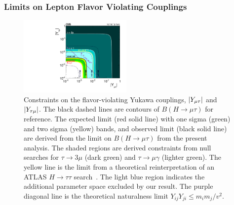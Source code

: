 \documentclass[oneside, letterpaper, oldfontcommands]{memoir}
\DeclarePairedDelimiter{\abs}{\lvert}{\rvert}
\begin{document}
 \subsubsection{Limits on Lepton Flavor Violating Couplings}
\begin{figure}[hbt]\centering
\includegraphics[width=0.49\textwidth]{yukawa.pdf}
 \caption{\cite{Khachatryan:2015kon}Constraints on the flavor-violating Yukawa couplings, $\abs{Y_{\mu\tau}}$ and $\abs{Y_{\tau\mu}}$.
The black dashed lines are contours of $B(H \rightarrow \mu \tau )$ for reference.
The expected limit (red solid line) with one sigma (green)  and two sigma (yellow) bands, and observed limit (black solid line) are derived from the limit on $B(H \rightarrow \mu \tau )$ from the present analysis.  The shaded regions are derived constraints from null searches for $\tau \rightarrow 3\mu$ (dark green) and $\tau \rightarrow \mu \gamma$ (lighter green). 
The yellow line is the limit from a theoretical reinterpretation of an ATLAS $H \rightarrow \tau \tau$ search~\cite{Harnik:2012pb}.
The light blue region indicates the additional parameter space excluded by our result.
The purple diagonal line is the theoretical naturalness
limit $Y_{ij}Y_{ji} \leq m_im_j/v^2$. }
 \label{fig:yukawalimits}\end{figure}
\end{document}
